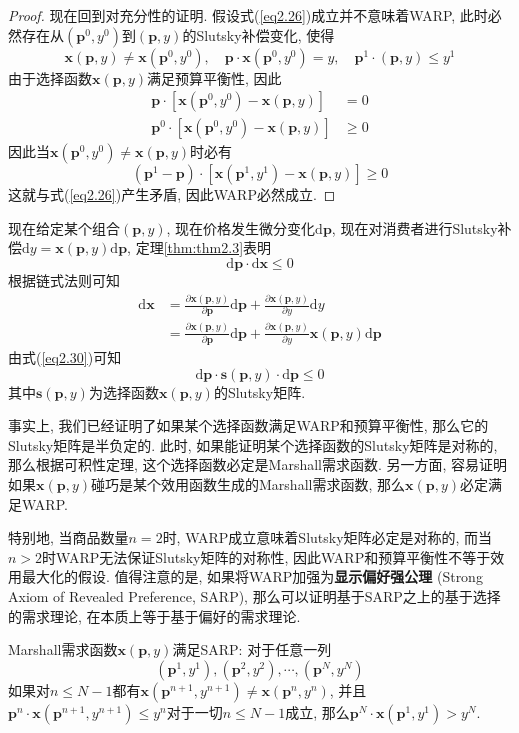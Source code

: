 \documentclass[cn, 12pt, math=mtpro2, bibstyle=apa, blue]{elegantbook}
\newcommand{\p}{\mathbf{p}}
\newcommand{\x}{\mathbf{x}}
\begin{document}
\begin{proof}
  现在回到对充分性的证明. 假设式(\ref{eq2.26})成立并不意味着WARP, 此时必然存在从$(\p^0,y^0)$到$(\p,y)$的Slutsky补偿变化, 使得
  $$\x(\p,y)\neq \x(\p^0,y^0),\quad \p\cdot\x(\p^0,y^0)=y,\quad \p^1\cdot(\p,y)\leq y^1$$
  由于选择函数$\x(\p,y)$满足预算平衡性, 因此
  \begin{align*}
  \p\cdot[\x(\p^0,y^0)-\x(\p,y)]&=0 \\
  \p^0\cdot [\x(\p^0,y^0)-\x(\p,y)]&\ge0
  \end{align*}
  因此当$\x(\p^0,y^0)\neq \x(\p,y)$时必有
  $$(\p^1-\p)\cdot [\x(\p^1,y^1)-\x(\p,y)]\geq 0$$
  这就与式(\ref{eq2.26})产生矛盾, 因此WARP必然成立.
  \end{proof}
现在给定某个组合$(\p,y)$, 现在价格发生微分变化$\text{d}\p$, 现在对消费者进行Slutsky补偿$\text{d}y=\x(\p,y)\text{d}\p$, 定理\ref{thm:thm2.3}表明
\begin{equation}\label{eq2.30}
  \text{d}\p\cdot\text{d}\x\leq0
\end{equation}
根据链式法则可知
\begin{align*}
\text{d}\x&=\frac{\partial \x(\p,y)}{\partial\p}\text{d}\p+\frac{\partial \x(\p,y)}{\partial y}\text{d}y \\
&=\frac{\partial \x(\p,y)}{\partial\p}\text{d}\p+\frac{\partial \x(\p,y)}{\partial y}\x(\p,y)\text{d}\p
\end{align*}
由式(\ref{eq2.30})可知
$$\text{d}\p\cdot \mathbf{s}(\p,y)\cdot \text{d}\p\leq 0$$
其中$\mathbf{s}(\p,y)$为选择函数$\x(\p,y)$的Slutsky矩阵.

事实上, 我们已经证明了如果某个选择函数满足WARP和预算平衡性, 那么它的Slutsky矩阵是半负定的. 此时, 如果能证明某个选择函数的Slutsky矩阵是对称的, 那么根据可积性定理, 这个选择函数必定是Marshall需求函数. 另一方面, 容易证明如果$\x(\p,y)$碰巧是某个效用函数生成的Marshall需求函数, 那么$\x(\p,y)$必定满足WARP.

特别地, 当商品数量$n=2$时, WARP成立意味着Slutsky矩阵必定是对称的, 而当$n>2$时WARP无法保证Slutsky矩阵的对称性, 因此WARP和预算平衡性不等于效用最大化的假设. 值得注意的是, 如果将WARP加强为\textbf{显示偏好强公理} (Strong Axiom of Revealed Preference, SARP), 那么可以证明基于SARP之上的基于选择的需求理论, 在本质上等于基于偏好的需求理论.

\begin{definition}[显示偏好强公理]
Marshall需求函数$\x(\p,y)$满足SARP: 对于任意一列
$$(\p^1,y^1),(\p^2,y^2),\cdots,(\p^N,y^N)$$
如果对$n\le N-1$都有$\x(\p^{n+1},y^{n+1})\neq \x(\p^n,y^n)$, 并且$\p^n\cdot\x(\p^{n+1},y^{n+1})\leq y^n$对于一切$n\leq N-1$成立, 那么$\p^N\cdot\x(\p^1,y^1)>y^N$.
\end{definition}
\end{document}
